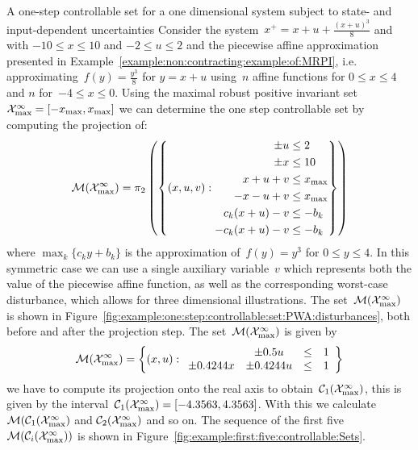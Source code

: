 \begin{example}{A one-step controllable set for a one dimensional system subject to state- and input-dependent uncertainties}\label{example:one:dimensional:one:step:controllable:set:PWA:disturbances}
Consider the system~$x^+ = x+u + \frac{(x+u)^3}{8}$ and with $-10\leq x\leq 10$ and $-2\leq u\leq 2$ and the piecewise affine approximation presented in Example~\ref{example:non:contracting:example:of:MRPI}, i.e. approximating~$f(y)=\frac{y^3}{8}$ for $y=x+u$ using~$n$ affine functions for $0\leq x\leq 4$ and $n$ for~$-4\leq x\leq 0$.
%
Using the maximal robust positive invariant set $\mathcal X^\infty_{\max}=[-x_{\max},x_{\max}]$ we can determine the one step controllable set by computing the projection of:
%
\[
	\mathcal M(\mathcal X^\infty_{\max}) = \pi_2\left(\left\{
	(x,u,v):\begin{aligned}
	\pm u&\leq 2\\
	\pm x&\leq 10\\
	x+u+v&\leq x_{\max}\\
	-x-u+v&\leq x_{\max}\\
	c_k(x+u)-v&\leq -b_k\\
	-c_k(x+u)-v&\leq -b_k
	\end{aligned}
	\right\}\right)
\]
%
where $\max_{k}\{c_k y+b_k\}$ is the approximation of~$f(y)=y^3$ for $0\leq y\leq4$.
%
In this symmetric case we can use a single auxiliary variable~$v$ which represents both the value of the piecewise affine function, as well as the corresponding worst-case disturbance, which allows for three dimensional illustrations.
%
The set~$\mathcal M(\mathcal X^\infty_{\max})$ is shown in Figure~\ref{fig:example:one:step:controllable:set:PWA:disturbances}, both before and after the projection step.
%
The set~$\mathcal M(\mathcal X^\infty_{\max})$ is given by
%
\[
\mathcal M(\mathcal X^\infty_{\max}) = \left\{(x,u):    \begin{array}{cccc} &\pm0.5u& \leq& 1\\
    \pm0.4244x&  \pm0.4244u&\leq&1\end{array} \right\}
\]
%
we have to compute its projection onto the real axis to obtain~$\mathcal C_1(\mathcal X^\infty_{\max})$, this is given by the interval~$\mathcal C_1(\mathcal X^\infty_{\max})=[-4.3563,4.3563]$.
%
With this we calculate~$\mathcal M(\mathcal C_1(\mathcal X^\infty_{\max})$ and $\mathcal C_2(\mathcal X^\infty_{\max})$ and so on.
%
The sequence of the first five $\mathcal M(\mathcal C_i(\mathcal X^\infty_{\max}))$ is shown in Figure~\ref{fig:example:first:five:controllable:Sets}.


\begin{figure}\centering
{}
\end{figure}
\end{example}
